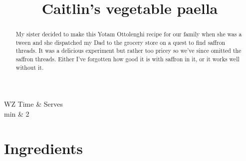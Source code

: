 \documentclass[main.tex]{subfiles}
\title{Caitlin's vegetable paella }
\begin{document}
\maketitle

\begin{margintable}
\begin{tabularx}{\textwidth}{WZ}
Time  & Serves\\ 
 min & 2
\end{tabularx}
\end{margintable}

\begin{abstract}
My sister decided to make this Yotam Ottolenghi recipe for our family when she was a tween and she dispatched my Dad to the grocery store on a quest to find saffron threads. It was a delicious experiment but rather too pricey so we've since omitted the saffron threads. Either I've forgotten how good it is with saffron in it, or it works well without it.
\end{abstract}

\section{Ingredients}
\end{document}
